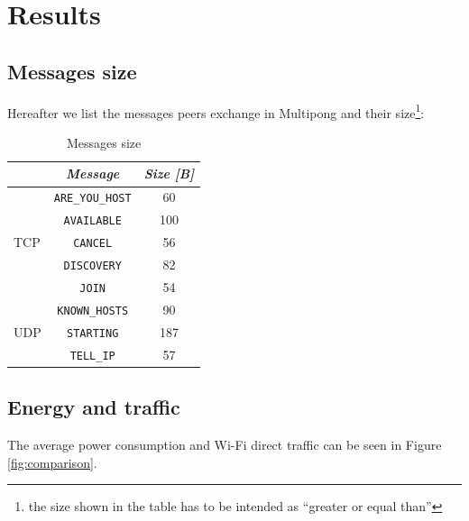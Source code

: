 \section{Results}

\subsection{Messages size}

Hereafter we list the messages peers exchange in Multipong and their
size\footnote{the size shown in the table has to be intended as ``greater or
equal than''}:

\begin{table}[H]
  \centering
  \begin{tabular}{l|c c}
  & \textbf{\textit{Message}} & \textbf{\textit{Size [B]}}  \tabularnewline
            \hline
            \multirow{5}{*}{TCP} & \multicolumn{1}{c}{\texttt{ARE\_YOU\_HOST}} & \multicolumn{1}{c}{60} \\\cline{2-3}
                                 & \multicolumn{1}{c}{\texttt{AVAILABLE}} & \multicolumn{1}{c}{100} \\\cline{2-3}
                                 & \multicolumn{1}{c}{\texttt{CANCEL}} & \multicolumn{1}{c}{56} \\\cline{2-3}
                                 & \multicolumn{1}{c}{\texttt{DISCOVERY}} & \multicolumn{1}{c}{82} \\\cline{2-3}
                                 & \multicolumn{1}{c}{\texttt{JOIN}} & \multicolumn{1}{c}{54} \\\hline
            \multirow{3}{*}{UDP} & \multicolumn{1}{c}{\texttt{KNOWN\_HOSTS}} & \multicolumn{1}{c}{90} \\\cline{2-3}
                                 & \multicolumn{1}{c}{\texttt{STARTING}} & \multicolumn{1}{c}{187} \\\cline{2-3}
                                 & \multicolumn{1}{c}{\texttt{TELL\_IP}} & \multicolumn{1}{c}{57} \\\hline
        \end{tabular}
  \caption{Messages size}
  \label{tab:sizes}
\end{table}

\subsection{Energy and traffic}

The average power consumption and Wi-Fi direct traffic can be seen in Figure
\ref{fig:comparison}.

